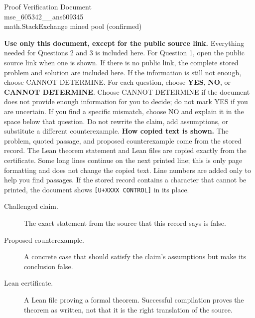 \documentclass[11pt]{article}
\begin{document}
\begin{center}{\LARGE Proof Verification Document}\\[2pt]{\large mse\_605342\_\_ans609345}\\[2pt]{\small math.StackExchange mined pool (confirmed)}\end{center}
\begin{center}\end{center}
\textbf{Use only this document, except for the public source link.} Everything needed for Questions 2 and 3 is included here. For Question 1, open the public source link when one is shown. If there is no public link, the complete stored problem and solution are included here. If the information is still not enough, choose CANNOT DETERMINE.
For each question, choose \textbf{YES}, \textbf{NO}, or \textbf{CANNOT DETERMINE}. Choose CANNOT DETERMINE if the document does not provide enough information for you to decide; do not mark YES if you are uncertain. If you find a specific mismatch, choose NO and explain it in the space below that question. Do not rewrite the claim, add assumptions, or substitute a different counterexample.
\textbf{How copied text is shown.} The problem, quoted passage, and proposed counterexample come from the stored record. The Lean theorem statement and Lean files are copied exactly from the certificate. Some long lines continue on the next printed line; this is only page formatting and does not change the copied text. Line numbers are added only to help you find passages. If the stored record contains a character that cannot be printed, the document shows \texttt{[U+XXXX CONTROL]} in its place.
\begin{description}
\item[Challenged claim.] The exact statement from the source that this record says is false.
\item[Proposed counterexample.] A concrete case that should satisfy the claim's assumptions but make its conclusion false.
\item[Lean certificate.] A Lean file proving a formal theorem. Successful compilation proves the theorem as written, not that it is the right translation of the source.
\end{description}
\end{document}
